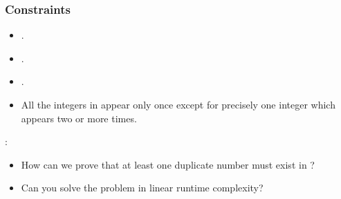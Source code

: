 \documentclass[letterpaper,12pt,english]{book}
\begin{document}
\subsubsection{Constraints}
\label{\detokenize{Sorting/04_SORT_287_Find_the_Duplicate_Number:constraints}}\begin{itemize}
\item {} 
\sphinxAtStartPar
{}.

\item {} 
\sphinxAtStartPar
{}.

\item {} 
\sphinxAtStartPar
{}.

\item {} 
\sphinxAtStartPar
All the integers in  appear only once except for precisely one integer which appears two or more times.

\end{itemize}

\sphinxAtStartPar
{}:
\begin{itemize}
\item {} 
\sphinxAtStartPar
How can we prove that at least one duplicate number must exist in ?

\item {} 
\sphinxAtStartPar
Can you solve the problem in linear runtime complexity?

\end{itemize}
\end{document}
